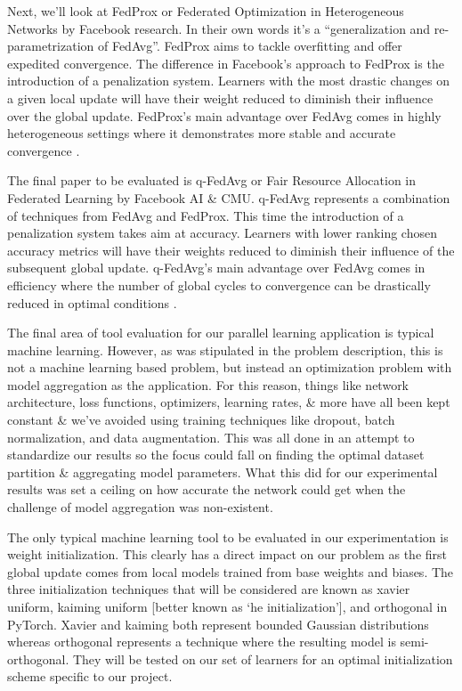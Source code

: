 \documentclass[../mthe-493-final-project.tex]{subfiles}
\begin{document}
    Next, we’ll look at FedProx or Federated Optimization in Heterogeneous Networks by Facebook research. In their own words it’s a “generalization and re-parametrization of FedAvg”. FedProx aims to tackle overfitting and offer expedited convergence. The difference in Facebook’s approach to FedProx is the introduction of a penalization system. Learners with the most drastic changes on a given local update will have their weight reduced to diminish their influence over the global update. FedProx’s main advantage over FedAvg comes in highly heterogeneous settings where it demonstrates more stable and accurate convergence \cite{FedProx}.
    
    The final paper to be evaluated is q-FedAvg or Fair Resource Allocation in Federated Learning by Facebook AI \& CMU. q-FedAvg represents a combination of techniques from FedAvg and FedProx. This time the introduction of a penalization system takes aim at accuracy. Learners with lower ranking chosen accuracy metrics will have their weights reduced to diminish their influence of the subsequent global update. q-FedAvg’s main advantage over FedAvg comes in efficiency where the number of global cycles to convergence can be drastically reduced in optimal conditions \cite{q-FedAvg}.
    
    The final area of tool evaluation for our parallel learning application is typical machine learning. However, as was stipulated in the problem description, this is not a machine learning based problem, but instead an optimization problem with model aggregation as the application. For this reason, things like network architecture, loss functions, optimizers, learning rates, \& more have all been kept constant \& we’ve avoided using training techniques like dropout, batch normalization, and data augmentation. This was all done in an attempt to standardize our results so the focus could fall on finding the optimal dataset partition \& aggregating model parameters. What this did for our experimental results was set a ceiling on how accurate the network could get when the challenge of model aggregation was non-existent.
    
    The only typical machine learning tool to be evaluated in our experimentation is weight initialization. This clearly has a direct impact on our problem as the first global update comes from local models trained from base weights and biases. The three initialization techniques that will be considered are known as xavier uniform, kaiming uniform [better known as ‘he initialization’], and orthogonal in PyTorch. Xavier and kaiming both represent bounded Gaussian distributions whereas orthogonal represents a technique where the resulting model is semi-orthogonal. They will be tested on our set of learners for an optimal initialization scheme specific to our project.
\end{document}
